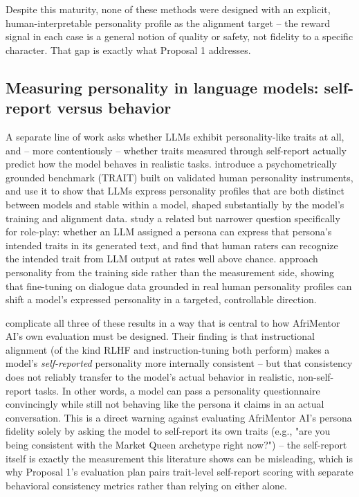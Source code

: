 Despite this maturity, none of these methods were designed with an explicit, human-interpretable personality profile as the alignment target -- the reward signal in each case is a general notion of quality or safety, not fidelity to a specific character. That gap is exactly what Proposal 1 addresses.

\subsection{Measuring personality in language models: self-report versus behavior}

A separate line of work asks whether LLMs exhibit personality-like traits at all, and -- more contentiously -- whether traits measured through self-report actually predict how the model behaves in realistic tasks. \citet{lee2024trait} introduce a psychometrically grounded benchmark (TRAIT) built on validated human personality instruments, and use it to show that LLMs express personality profiles that are both distinct between models and stable within a model, shaped substantially by the model's training and alignment data. \citet{jiang2023personallm} study a related but narrower question specifically for role-play: whether an LLM assigned a persona can express that persona's intended traits in its generated text, and find that human raters can recognize the intended trait from LLM output at rates well above chance. \citet{li2024big5chat} approach personality from the training side rather than the measurement side, showing that fine-tuning on dialogue data grounded in real human personality profiles can shift a model's expressed personality in a targeted, controllable direction.

\citet{han2025illusion} complicate all three of these results in a way that is central to how AfriMentor AI's own evaluation must be designed. Their finding is that instructional alignment (of the kind RLHF and instruction-tuning both perform) makes a model's \emph{self-reported} personality more internally consistent -- but that consistency does not reliably transfer to the model's actual behavior in realistic, non-self-report tasks. In other words, a model can pass a personality questionnaire convincingly while still not behaving like the persona it claims in an actual conversation. This is a direct warning against evaluating AfriMentor AI's persona fidelity solely by asking the model to self-report its own traits (e.g., "are you being consistent with the Market Queen archetype right now?") -- the self-report itself is exactly the measurement this literature shows can be misleading, which is why Proposal 1's evaluation plan pairs trait-level self-report scoring with separate behavioral consistency metrics rather than relying on either alone.


